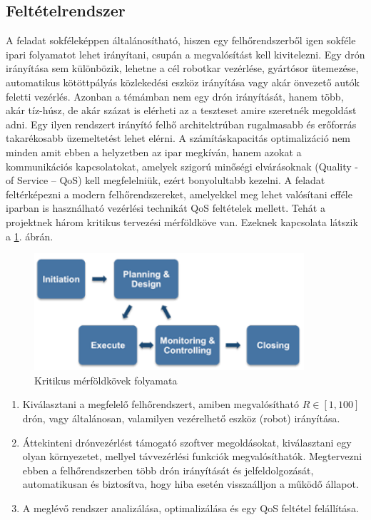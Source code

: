 \subsection{Feltételrendszer}
A feladat sokféleképpen általánosítható, hiszen egy felhőrendszerből igen sokféle ipari folyamatot lehet irányítani, csupán a megvalósítást kell kivitelezni. Egy drón irányítása sem különbözik, lehetne a cél robotkar vezérlése, gyártósor ütemezése, automatikus kötöttpályás közlekedési eszköz irányítása vagy akár önvezető autók feletti vezérlés.
 Azonban a témámban nem egy drón irányítását, hanem több, akár tíz-húsz, de akár százat is elérheti az a teszteset amire szeretnék megoldást adni. Egy ilyen rendszert irányító felhő architektrúban rugalmasabb és erőforrás takarékosabb üzemeltetést lehet elérni. A számításkapacitás optimalizáció nem minden amit ebben a helyzetben az ipar megkíván, hanem azokat a kommunikációs kapcsolatokat, amelyek szigorú minőségi elvárásoknak (Quality -of Service – QoS) kell megfelelniük, ezért bonyolultabb kezelni. A feladat feltérképezni a modern felhőrendszereket, amelyekkel meg lehet valósítani efféle iparban is használható vezérlési technikát QoS feltételek mellett. Tehát a projektnek három kritikus tervezési mérföldköve van. Ezeknek kapcsolata látszik a \ref{fig:merfold}. ábrán.
\begin{figure}
	\centering
	\includegraphics[width=10cm]{figures/plan_excecute_monitor.png}
	\caption{Kritikus mérföldkövek folyamata \cite{ProjecPlan}}
	\label{fig:merfold}
\end{figure}
\begin{enumerate}
	\item Kiválasztani a megfelelő felhőrendszert, amiben megvalósítható $R\in [1, 100]$ drón, vagy általánosan, valamilyen vezérelhető eszköz (robot) irányítása.
	\item Áttekinteni drónvezérlést támogató szoftver megoldásokat, kiválasztani egy olyan környezetet, mellyel távvezérlési funkciók megvalósíthatók. Megtervezni ebben a felhőrendszerben több drón irányítását és jelfeldolgozását, automatikusan és biztosítva, hogy hiba esetén visszaálljon a működő állapot.
	\item A meglévő rendszer analizálása, optimalizálása és egy QoS feltétel felállítása.
\end{enumerate}

